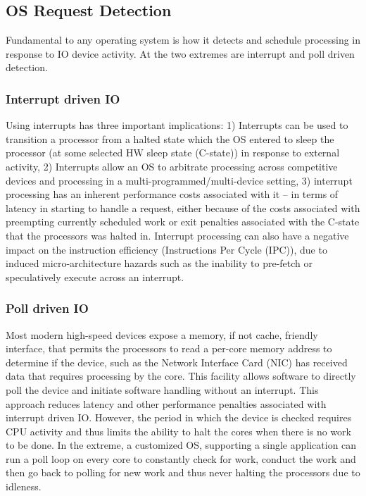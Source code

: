 \subsection{OS Request Detection}

Fundamental to any operating system is how it detects and schedule processing in response to IO device activity.  At the two extremes are interrupt and poll driven detection.  

\subsubsection{Interrupt driven IO}
\label{sec:workflow:interruptio}
Using interrupts has three important implications: 1) Interrupts can be used to transition a processor from a halted state which the OS entered to sleep the processor (at some selected HW sleep state (C-state)) in response to external activity, 2)  Interrupts allow an OS to arbitrate processing across competitive devices and processing in a multi-programmed/multi-device setting, 3) interrupt processing has an inherent performance costs associated with it -- in terms of latency in starting to handle a request, either because of the costs associated with preempting currently scheduled work\cite{whenpollisbetter} or exit penalties associated with the C-state that the processors was halted in\cite{cpuidle_policy}. Interrupt processing can also have a negative impact on the instruction efficiency (Instructions Per Cycle (IPC)), due to induced micro-architecture hazards such as the inability to pre-fetch or speculatively execute across an interrupt.

\subsubsection{Poll driven IO}
\label{sec:workflow:pollio}
Most modern high-speed devices expose a memory, if not cache, friendly interface, that permits the processors to read a per-core memory address to determine if the device, such as the Network Interface Card (NIC) has received data that requires processing by the core.  This facility allows software to directly poll the device and initiate software handling without an interrupt.  This approach reduces latency and other performance penalties associated with interrupt driven IO.  However, the period in which the device is checked requires CPU activity and thus limits the ability to halt the cores when there is no work to be done.  In the extreme, a customized OS, supporting a single application can run a poll loop on every core to constantly check for work, conduct the work and then go back to polling for new work and thus never halting the processors due to idleness. 

